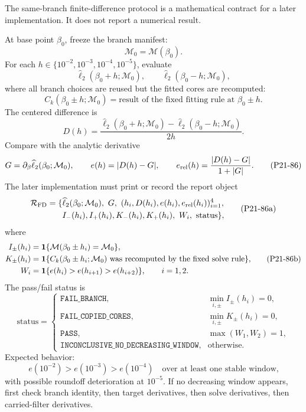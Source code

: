 \documentclass[11pt]{article}
\newcommand{\widehatell}{\widehat\ell}
\begin{document}
The same-branch finite-difference protocol is a mathematical contract for a
later implementation.  It does not report a numerical result.

At base point \(\beta_0\), freeze the branch manifest:
\[
    \mathcal M_0=\mathcal M(\beta_0).
    \tag{P21-82}
\]
For each \(h\in\{10^{-2},10^{-3},10^{-4},10^{-5}\}\), evaluate
\[
    \widehatell_2(\beta_0+h;\mathcal M_0),
    \qquad
    \widehatell_2(\beta_0-h;\mathcal M_0),
    \tag{P21-83}
\]
where all branch choices are reused but the fitted cores are recomputed:
\[
    C_k(\beta_0\pm h;\mathcal M_0)
    =
    \text{result of the fixed fitting rule at }\beta_0\pm h.
    \tag{P21-84}
\]
The centered difference is
\[
    D(h)=
    \frac{
    \widehatell_2(\beta_0+h;\mathcal M_0)
    -
    \widehatell_2(\beta_0-h;\mathcal M_0)}
    {2h}.
    \tag{P21-85}
\]
Compare with the analytic derivative
\[
    G=\partial_\beta\widehatell_2(\beta_0;\mathcal M_0),
    \qquad
    e(h)=|D(h)-G|,
    \qquad
    e_{\rm rel}(h)=\frac{|D(h)-G|}{1+|G|}.
    \tag{P21-86}
\]
The later implementation must print or record the report object
\[
\begin{aligned}
    \mathcal R_{\rm FD}
    =
    \{&
    \widehatell_2(\beta_0;\mathcal M_0),\
    G,\
    (h_i,D(h_i),e(h_i),e_{\rm rel}(h_i))_{i=1}^{4},\\
    &I_-(h_i),I_+(h_i),K_-(h_i),K_+(h_i),\
    W_i,\ \text{status}\},
\end{aligned}
\tag{P21-86a}
\]
where
\[
\begin{aligned}
    I_\pm(h_i)
    &=
    {\bf 1}\{\mathcal M(\beta_0\pm h_i)=\mathcal M_0\},\\
    K_\pm(h_i)
    &=
    {\bf 1}\{C_k(\beta_0\pm h_i;\mathcal M_0)
        \text{ was recomputed by the fixed solve rule}\},\\
    W_i
    &=
    {\bf 1}\{e(h_i)>e(h_{i+1})>e(h_{i+2})\},
    \qquad i=1,2.
\end{aligned}
\tag{P21-86b}
\]
The pass/fail status is
\[
\text{status}
=
\begin{cases}
\texttt{FAIL\_BRANCH},&
    \min_{i,\pm} I_\pm(h_i)=0,\\
\texttt{FAIL\_COPIED\_CORES},&
    \min_{i,\pm} K_\pm(h_i)=0,\\
\texttt{PASS},&
    \max(W_1,W_2)=1,\\
\texttt{INCONCLUSIVE\_NO\_DECREASING\_WINDOW},&
    \text{otherwise}.
\end{cases}
\tag{P21-86c}
\]
Expected behavior:
\[
    e(10^{-2})>e(10^{-3})>e(10^{-4})
    \quad\text{over at least one stable window,}
    \tag{P21-87}
\]
with possible roundoff deterioration at \(10^{-5}\).  If no decreasing window
appears, first check branch identity, then target derivatives, then solve
derivatives, then carried-filter derivatives.
\end{document}

